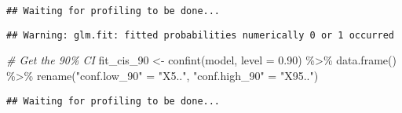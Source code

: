 \documentclass[
]{article}
\newenvironment{Shaded}{\begin{snugshade}}{\end{snugshade}}
\newcommand{\AttributeTok}[1]{\textcolor[rgb]{0.77,0.63,0.00}{#1}}
\newcommand{\CommentTok}[1]{\textcolor[rgb]{0.56,0.35,0.01}{\textit{#1}}}
\newcommand{\FloatTok}[1]{\textcolor[rgb]{0.00,0.00,0.81}{#1}}
\newcommand{\FunctionTok}[1]{\textcolor[rgb]{0.00,0.00,0.00}{#1}}
\newcommand{\NormalTok}[1]{#1}
\newcommand{\OtherTok}[1]{\textcolor[rgb]{0.56,0.35,0.01}{#1}}
\newcommand{\SpecialCharTok}[1]{\textcolor[rgb]{0.00,0.00,0.00}{#1}}
\newcommand{\StringTok}[1]{\textcolor[rgb]{0.31,0.60,0.02}{#1}}
\begin{document}
\begin{verbatim}
## Waiting for profiling to be done...
\end{verbatim}

\begin{verbatim}
## Warning: glm.fit: fitted probabilities numerically 0 or 1 occurred
\end{verbatim}

\begin{Shaded}
\begin{Highlighting}[]
\CommentTok{\# Get the 90\% CI}
\NormalTok{fit\_cis\_90 }\OtherTok{\textless{}{-}} \FunctionTok{confint}\NormalTok{(model, }\AttributeTok{level =} \FloatTok{0.90}\NormalTok{) }\SpecialCharTok{\%\textgreater{}\%} 
  \FunctionTok{data.frame}\NormalTok{() }\SpecialCharTok{\%\textgreater{}\%}
  \FunctionTok{rename}\NormalTok{(}\StringTok{"conf.low\_90"} \OtherTok{=} \StringTok{"X5.."}\NormalTok{,}
         \StringTok{"conf.high\_90"} \OtherTok{=} \StringTok{"X95.."}\NormalTok{)}
\end{Highlighting}
\end{Shaded}

\begin{verbatim}
## Waiting for profiling to be done...
\end{verbatim}
\end{document}
